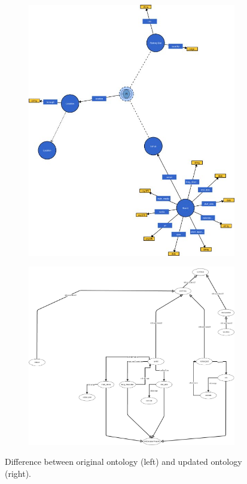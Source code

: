 \documentclass[runningheads,a4paper]{../../StyleFiles/llncs}
\begin{document}
\begin{figure}[h] \centering
	\begin{subfigure}{.5\textwidth} \centering
		\includegraphics[width=.9\textwidth]{img/old_ontology.jpg}
		\label{fig:old_ontology}
	\end{subfigure}%
	\begin{subfigure}{.5\textwidth} \centering
		\includegraphics[width=.9\textwidth]{img/ontology.png}
		\label{fig:new_ontology}
	\end{subfigure}
	\caption{Difference between original ontology (left) and updated ontology (right).}
	\label{fig:ontology}
\end{figure}
\end{document}
